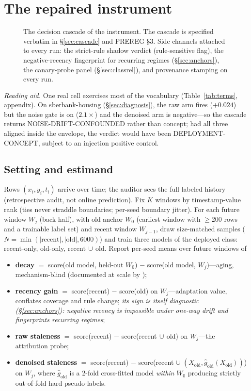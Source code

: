 \documentclass[10pt]{article} %
\begin{document}
\section{The repaired instrument}\label{sec:instrument}

\begin{figure}[t]
\centering
\resizebox{\textwidth}{!}{}
\caption{The decision cascade of the instrument. The cascade is specified verbatim in
\S\ref{sec:cascade} and PREREG \S3. Side channels attached to every run: the strict-rule shadow
verdict (rule-sensitive flag), the negative-recency fingerprint for recurring regimes
(\S\ref{sec:anchors}), the canary-probe panel (\S\ref{sec:classrel}), and provenance stamping
on every run.}
\label{fig:cascade}
\end{figure}

\emph{Reading aid.} One real cell exercises most of the vocabulary (Table~\ref{tab:terms}, appendix). On
sberbank-housing (\S\ref{sec:diagnosis}), the raw arm fires ($+0.024$) but the noise gate is on
($2.1\times$) and the denoised arm is negative---so the cascade returns NOISE-DRIFT-CONFOUNDED
rather than concept; had all three aligned inside the envelope, the verdict would have been
DEPLOYMENT-CONCEPT, subject to an injection positive control.

\subsection{Setting and estimand}\label{sec:setting}

Rows $(x_i, y_i, t_i)$ arrive over time; the auditor sees the full labeled history (retrospective audit, not online prediction). Fix $K$ windows by timestamp-value rank (ties never straddle boundaries; per-seed boundary jitter). For each future window $W_j$ (back half), with old anchor $W_0$ (earliest window with $\ge 200$ rows and a trainable label set) and recent window $W_{j-1}$, draw size-matched samples ($N = \min(|\text{recent}|, |\text{old}|, 6000)$) and train three models of the deployed class: recent-only, old-only, recent$\,\cup\,$old. Report per-seed means over future windows of \begin{itemize} \item \textbf{decay} $=$ score(old model, held-out $W_0$) $-$ score(old model, $W_j$)---aging, mechanism-blind (documented at scale by \citealp{vela2022temporal}); \item \textbf{recency gain} $=$ score(recent) $-$ score(old) on $W_j$---adaptation value, conflates coverage and rule change; \emph{its sign is itself diagnostic (\S\ref{sec:anchors}): negative recency is impossible under one-way drift and fingerprints recurring regimes}; \item \textbf{raw staleness} $=$ score(recent) $-$ score(recent$\,\cup\,$old) on $W_j$---the attribution probe; \item \textbf{denoised staleness} $=$ score(recent) $-$ score(recent $\cup$ $(X_{\text{old}}, \hat{g}_{\text{old}}(X_{\text{old}}))$) on $W_j$, where $\hat{g}_{\text{old}}$ is a 2-fold cross-fitted model \emph{within} $W_0$ producing strictly out-of-fold hard pseudo-labels. \end{itemize}
\end{document}
